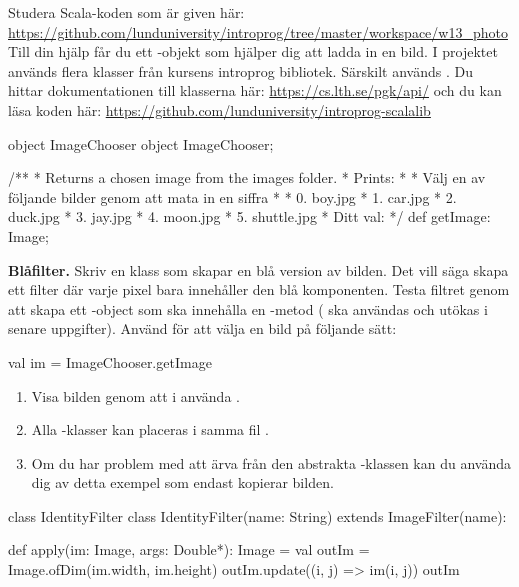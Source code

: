 Studera Scala-koden som är given här: \url{https://github.com/lunduniversity/introprog/tree/master/workspace/w13_photo}
Till din hjälp får du ett -objekt som hjälper dig att ladda in en bild. 
I projektet används flera klasser från kursens introprog bibliotek. Särskilt används .
Du hittar dokumentationen till klasserna här: \url{https://cs.lth.se/pgk/api/} och du kan läsa koden här: \url{https://github.com/lunduniversity/introprog-scalalib}

\begin{ScalaSpec}{object ImageChooser}
	object ImageChooser;
	
	/**
	* Returns a chosen image from the images folder.
	* Prints:	
	*
	*	Välj en av följande bilder genom att mata in en siffra
	*
	*	0. boy.jpg
	*	1. car.jpg
	*	2. duck.jpg
	*	3. jay.jpg
	*	4. moon.jpg
	*	5. shuttle.jpg
	*	Ditt val: 
	*/
	def getImage: Image;
\end{ScalaSpec}


\Task \textbf{Blåfilter.} Skriv en klass  som skapar en blå version av bilden. 
Det vill säga skapa ett filter där varje pixel bara innehåller den blå komponenten. 
Testa filtret genom att skapa ett -object som ska innehålla en 
-metod ( ska användas och utökas i senare uppgifter). 
Använd  för att välja en bild på följande sätt:
\begin{Code}
	val im = ImageChooser.getImage
\end{Code}
\begin{enumerate}
	\item Visa bilden genom att i  använda . 
	\item Alla -klasser kan placeras i samma fil .
	\item Om du har problem med att ärva från den abstrakta -klassen kan du använda dig av detta exempel som endast kopierar bilden.
\end{enumerate}
\begin{ScalaSpec}{class IdentityFilter}
	class IdentityFilter(name: String) extends ImageFilter(name):
	
	  def apply(im: Image, args: Double*): Image = 
		val outIm = Image.ofDim(im.width, im.height)
		outIm.update((i, j) => im(i, j))
		outIm
	\end{ScalaSpec}



